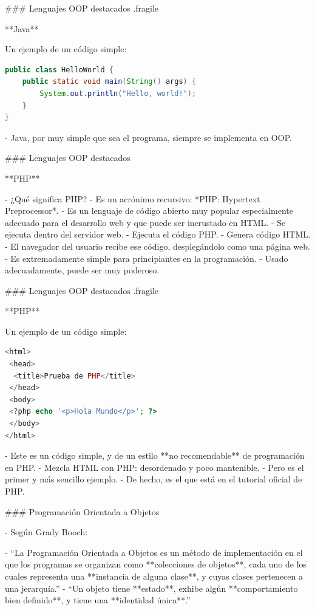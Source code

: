 ### Lenguajes OOP destacados {.fragile}

**Java**\vfill

Un ejemplo de un código simple:
\begin{lstlisting}[language=Java]
public class HelloWorld {
    public static void main(String() args) {
        System.out.println("Hello, world!");
    }
}
\end{lstlisting}

- Java, por muy simple que sea el programa, siempre se implementa en OOP.

### Lenguajes OOP destacados

**PHP**

- ¿Qué significa PHP?
    - Es un acrónimo recursivo: *PHP: Hypertext Preprocessor*.
- Es un lenguaje de código abierto muy popular especialmente adecuado para el desarrollo web y que puede ser incrustado en HTML. 
- Se ejecuta dentro del servidor web.
    - Ejecuta el código PHP.
    - Genera código HTML.
    - El navegador del usuario recibe ese código, desplegándolo como una página web.
- Es extremadamente simple para principiantes en la programación.
    - Usado adecuadamente, puede ser muy poderoso.

### Lenguajes OOP destacados {.fragile}

**PHP**\vfill

Un ejemplo de un código simple:
\begin{lstlisting}[language=PHP]
<html>
 <head>
  <title>Prueba de PHP</title>
 </head>
 <body>
 <?php echo '<p>Hola Mundo</p>'; ?>
 </body>
</html>
\end{lstlisting}

- Este es un código simple, y de un estilo **no recomendable** de programación en PHP.
    - Mezcla HTML con PHP: desordenado y poco mantenible.
    - Pero es el primer y más sencillo ejemplo.
    - De hecho, es el que está en el tutorial oficial de PHP.

### Programación Orientada a Objetos

- Según Grady Booch:\vspace{7mm}

    - ``La Programación Orientada a Objetos es un método de implementación en el que los programas se organizan como **colecciones de objetos**, cada uno de los cuales representa una **instancia de alguna clase**, y cuyas clases pertenecen a una jerarquía.''\vspace{10mm}
    - ``Un objeto tiene **estado**, exhibe algún **comportamiento bien definido**, y tiene una **identidad única**.''

